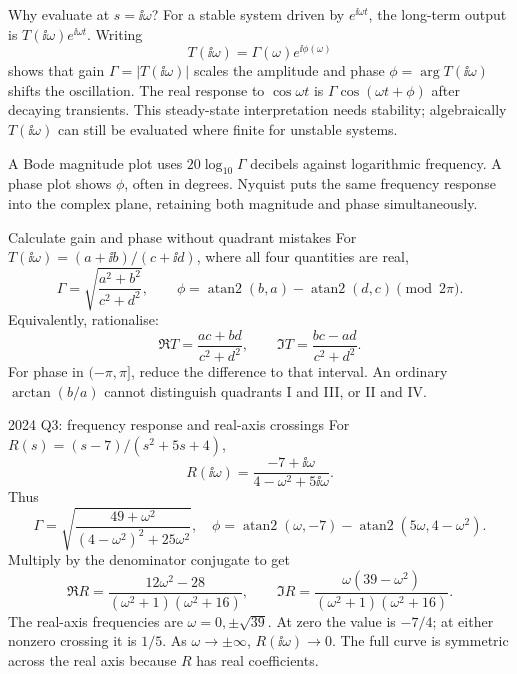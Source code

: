 \begin{concept}{Why evaluate at $s=\ii\omega$?}
For a stable system driven by $e^{\ii\omega t}$, the long-term output is $T(\ii\omega)e^{\ii\omega t}$. Writing
\[T(\ii\omega)=\Gamma(\omega)e^{\ii\phi(\omega)}\]
shows that gain $\Gamma=|T(\ii\omega)|$ scales the amplitude and phase $\phi=\arg T(\ii\omega)$ shifts the oscillation. The real response to $\cos\omega t$ is $\Gamma\cos(\omega t+\phi)$ after decaying transients. This steady-state interpretation needs stability; algebraically $T(\ii\omega)$ can still be evaluated where finite for unstable systems.

A Bode magnitude plot uses $20\log_{10}\Gamma$ decibels against logarithmic frequency. A phase plot shows $\phi$, often in degrees. Nyquist puts the same frequency response into the complex plane, retaining both magnitude and phase simultaneously.
\end{concept}
\begin{method}{Calculate gain and phase without quadrant mistakes}
For $T(\ii\omega)=(a+\ii b)/(c+\ii d)$, where all four quantities are real,
\[\Gamma=\sqrt{\frac{a^2+b^2}{c^2+d^2}},\qquad\phi=\operatorname{atan2}(b,a)-\operatorname{atan2}(d,c)\pmod{2\pi}.\]
Equivalently, rationalise:
\[\Re T=\frac{ac+bd}{c^2+d^2},\qquad\Im T=\frac{bc-ad}{c^2+d^2}.\]
For phase in $(-\pi,\pi]$, reduce the difference to that interval. An ordinary $\arctan(b/a)$ cannot distinguish quadrants I and III, or II and IV.
\end{method}
\begin{worked}{2024 Q3: frequency response and real-axis crossings}
For $R(s)=(s-7)/(s^2+5s+4)$,
\[R(\ii\omega)=\frac{-7+\ii\omega}{4-\omega^2+5\ii\omega}.\]
Thus
\[\Gamma=\sqrt{\frac{49+\omega^2}{(4-\omega^2)^2+25\omega^2}},\quad
\phi=\operatorname{atan2}(\omega,-7)-\operatorname{atan2}(5\omega,4-\omega^2).\]
Multiply by the denominator conjugate to get
\[\Re R=\frac{12\omega^2-28}{(\omega^2+1)(\omega^2+16)},\qquad\Im R=\frac{\omega(39-\omega^2)}{(\omega^2+1)(\omega^2+16)}.\]
The real-axis frequencies are $\omega=0,\pm\sqrt{39}$. At zero the value is $-7/4$; at either nonzero crossing it is $1/5$. As $\omega\to\pm\infty$, $R(\ii\omega)\to0$. The full curve is symmetric across the real axis because $R$ has real coefficients.
\end{worked}
